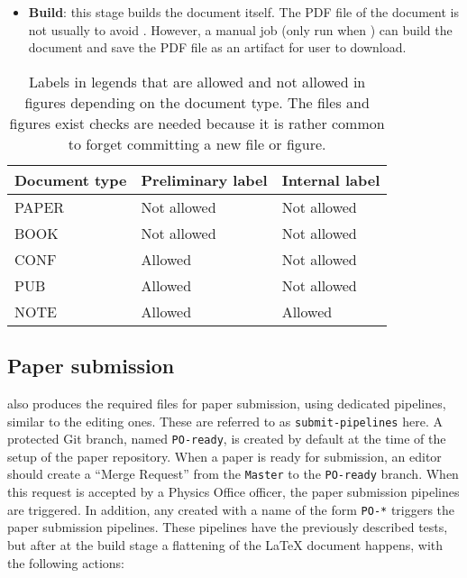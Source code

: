 \begin{itemize}
\item \textbf{Build}: this stage builds the document itself. The PDF file of the document is not usually  to avoid .
However, a manual job (only run when ) can build the document and save the PDF file as an artifact for  user to download.
\end{itemize}

\begin{table}[htb]
  \centering
  \begin{tabular}{lll}\toprule
    Document type & Preliminary label & Internal label \\
    \midrule
    PAPER & Not allowed & Not allowed \\
    BOOK & Not allowed & Not allowed \\
    CONF & Allowed & Not allowed \\
    PUB & Allowed & Not allowed \\
    NOTE & Allowed & Allowed \\
    \bottomrule
  \end{tabular}
  \caption{Labels in legends that are allowed and not allowed in figures depending on the document type.
    The files and figures exist checks are needed because it is rather common to forget committing a new file or figure.
    }%
  \label{tab:labels}
\end{table}

\subsection{Paper submission}%
\label{sec:Paper_submission}

 also produces the required files for paper submission, using dedicated pipelines, similar to the editing ones.
These are referred to as \texttt{submit-pipelines} here.
A protected Git branch, named \texttt{PO-ready}, is created by default at the time of the setup of the paper repository.
When a paper is ready for submission, an editor should create a \enquote{Merge Request}
from the \texttt{Master} to the \texttt{PO-ready} branch.
When this request is accepted by a Physics Office officer, the paper submission pipelines are triggered.
In addition, any  created with a name of the form \texttt{PO-*} triggers the paper submission pipelines.
These pipelines have the previously described tests, but after at the build stage a flattening of the LaTeX document happens, with the following actions:

